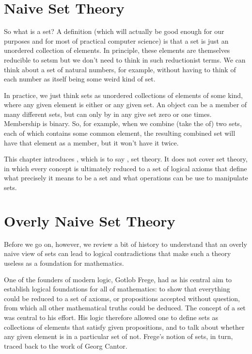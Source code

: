 \documentclass[letterpaper,10pt,english]{sphinxmanual}
\begin{document}
\section{Naive Set Theory}
\label{\detokenize{07-set-theory:naive-set-theory}}
So what is a set? A  definition (which will actually be good
enough for our purposes and for most of practical computer science) is
that a set is just an unordered collection of elements. In principle,
these elements are themselves reducible to setsm but we don’t need to
think in such reductionist terms. We can think about a set of natural
numbers, for example, without having to think of each number as itself
being some weird kind of set.

In practice, we just think sets as unordered collections of elements
of some kind, where any given element is either  or  any
given set. An object can be a member of many different sets, but can
only by in any give set zero or one times. Membership is binary.  So,
for example, when we combine (take the  of) two sets, each of
which contains some common element, the resulting combined set will
have that element as a member, but it won’t have it twice.

This chapter introduces , which is to say , set theory. It does not cover  set theory, in
which every concept is ultimately reduced to a set of logical axioms
that define what precisely it means to be a set and what operations
can be use to manipulate sets.


\section{Overly Naive Set Theory}
\label{\detokenize{07-set-theory:overly-naive-set-theory}}
Before we go on, however, we review a bit of history to understand
that an overly naive view of sets can lead to logical contradictions
that make such a theory useless as a foundation for mathematics.

One of the founders of modern logic, Gotlob Frege, had as his central
aim to establish logical foundations for all of mathematics: to show
that everything could be reduced to a set of axioms, or propositions
accepted without question, from which all other mathematical truths
could be deduced.  The concept of a set was central to his effort. His
logic therefore allowed one to define sets as collections of elements
that satisfy given propositions, and to talk about whether any given
element is in a particular set of not. Frege’s notion of sets, in
turn, traced back to the work of Georg Cantor.
\end{document}
